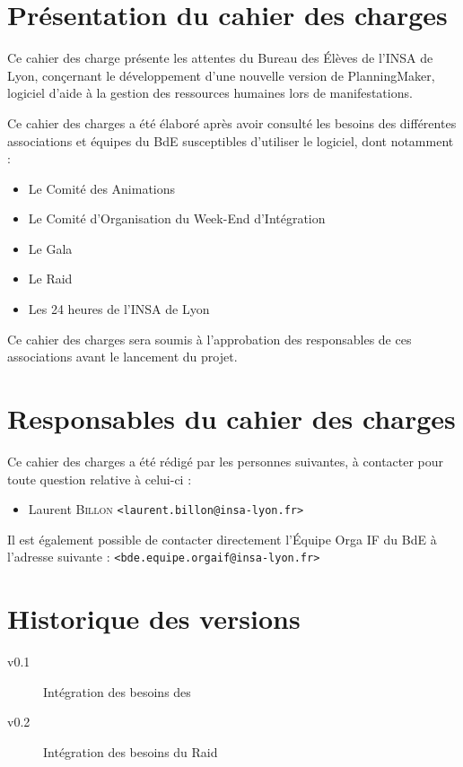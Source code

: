 \section{Présentation du cahier des charges}
Ce cahier des charge présente les attentes du Bureau des Élèves de l'INSA de Lyon, conçernant le développement d'une nouvelle version de PlanningMaker, logiciel
d'aide à la gestion des ressources humaines lors de manifestations.

Ce cahier des charges a été élaboré après avoir consulté les besoins des différentes associations et équipes du BdE susceptibles d'utiliser le logiciel, dont notamment : 
\begin{itemize}
\item Le Comité des Animations
\item Le Comité d'Organisation du Week-End d'Intégration
\item Le Gala
\item Le Raid
\item Les 24 heures de l'INSA de Lyon
\end{itemize}

Ce cahier des charges sera soumis à l'approbation des responsables de ces associations avant le lancement du projet.

\section{Responsables du cahier des charges}
Ce cahier des charges a été rédigé par les personnes suivantes, à contacter pour toute question relative à celui-ci : 
\begin{itemize}
 \item Laurent \textsc{Billon} \texttt{<laurent.billon@insa-lyon.fr>}
\end{itemize}

Il est également possible de contacter directement l'Équipe Orga IF du BdE à l'adresse suivante : \texttt{<bde.equipe.orgaif@insa-lyon.fr>}

\section{Historique des versions}

\begin{description}
\item[v0.1] Intégration des besoins des 
\item[v0.2] Intégration des besoins du Raid
\end{description}